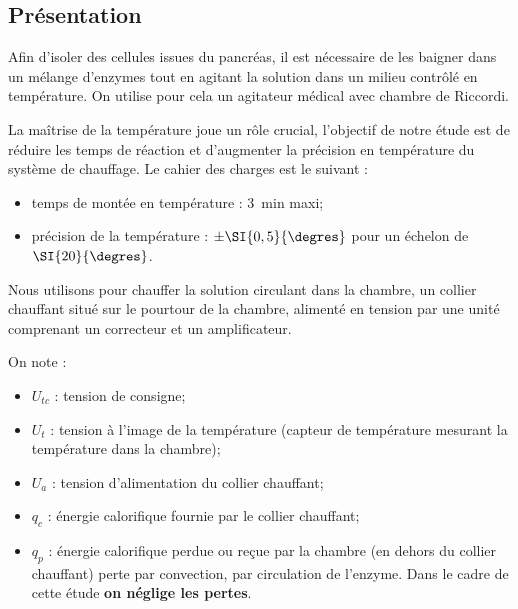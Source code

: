 \setcounter{exo}{0}
\begin{multicols}{2}

\subsection*{Présentation}


Afin d'isoler des cellules issues du pancréas, il est nécessaire de les baigner dans un mélange d'enzymes tout en agitant la solution dans un milieu contrôlé en température. On utilise pour cela 
un agitateur médical avec chambre de Riccordi.


\begin{obj}
La maîtrise de la température joue un rôle crucial, l’objectif de notre étude est de réduire les temps
de réaction et d’augmenter la précision en température du système de chauffage. Le cahier des charges est le suivant : 
\begin{itemize}
\item temps de montée en température : \SI{3}{min} maxi;
\item précision de la température : $\pm \SI{0,5}{\degres}$ pour un échelon de $\SI{20}{\degres}$.
\end{itemize}
\end{obj}
Nous utilisons pour chauffer la solution circulant dans la chambre, un collier chauffant situé sur le
pourtour de la chambre, alimenté en tension par une unité comprenant un correcteur et un
amplificateur.




On note : 
\begin{itemize}
\item $U_{tc}$ : tension de consigne;
\item $U_t$ : tension à l'image de la température (capteur de température mesurant la température dans la chambre);
\item $U_a$ : tension d'alimentation du collier chauffant;
\item $q_c$ : énergie calorifique fournie par le collier chauffant;
\item $q_p$ : énergie calorifique perdue ou reçue par la chambre (en dehors du collier chauffant) perte par convection, par circulation de l'enzyme. Dans le cadre de cette étude \textbf{on néglige les pertes}.
\end{itemize}


\end{multicols}
